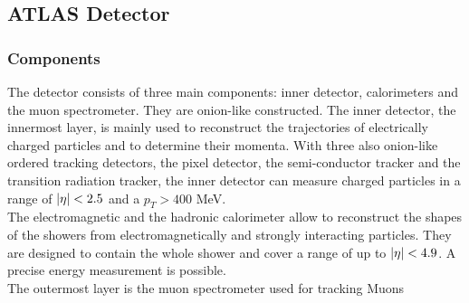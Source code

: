 \documentclass[12pt, a4paper, bibliography=totoc]{scrartcl}
\begin{document}
\begin{multicols}{2}
\subsection{ATLAS Detector}
\subsubsection{Components}
The detector consists of three main components: inner detector, calorimeters and the muon spectrometer.
They are onion-like constructed. 
The inner detector, the innermost layer, is mainly used to reconstruct the trajectories of electrically charged particles and to determine their momenta. 
With three also onion-like ordered tracking detectors, the pixel detector, the semi-conductor tracker and the transition radiation tracker, the inner detector can measure charged particles in a range of $\abs{\eta} < 2.5$ and a $p_{T} > 400$ \si{MeV}.\\

The electromagnetic and the hadronic calorimeter allow to reconstruct the shapes of the showers from electromagnetically and strongly interacting particles. 
They are designed to contain the whole shower and cover a range of up to $\abs{\eta} < 4.9$. 
A precise energy measurement is possible.\\
The outermost layer is the muon spectrometer used for tracking Muons


\end{multicols}
\end{document}
